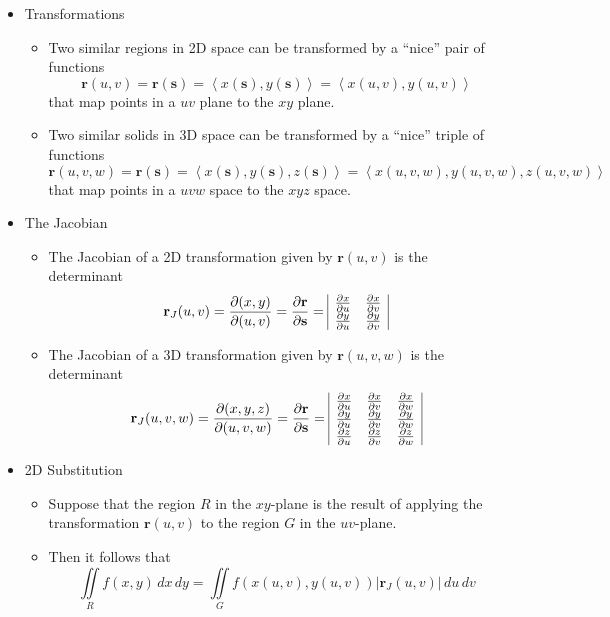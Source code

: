 \documentclass[12pt]{article}
\renewcommand{\vec}[1]{\mathbf{#1}}
\newcommand{\<}{\left<}
\renewcommand{\>}{\right>}
\newcommand{\p}{\partial}
\begin{document}
  \begin{itemize}
  
  \item Transformations
  
    \begin{itemize}
    \item Two similar regions in 2D space can be transformed by a ``nice'' pair of functions \[\vec{r}(u,v) = \vec{r}(\vec{s}) = \<x(\vec{s}),y(\vec{s})\> = \<x(u,v),y(u,v)\>\] that map points in a $uv$ plane to the $xy$ plane.
    \item Two similar solids in 3D space can be transformed by a ``nice'' triple of functions \[\vec{r}(u,v,w) = \vec{r}(\vec{s}) = \<x(\vec{s}),y(\vec{s}),z(\vec{s})\> = \<x(u,v,w),y(u,v,w),z(u,v,w)\>\] that map points in a $uvw$ space to the $xyz$ space.
    \end{itemize}
  
  \item The Jacobian
  
    \begin{itemize}
    \item The Jacobian of a 2D transformation given by $\vec{r}(u,v)$ is the determinant
\[
\vec{r}_J(u,v) = \frac{\p (x,y)}{\p (u,v)} = \frac{\p\vec{r}}{\p\vec{s}} =
\begin{array}{|c c|}
\frac{\p x}{\p u} & \frac{\p x}{\p v} \\
\frac{\p y}{\p u} & \frac{\p y}{\p v} \\
\end{array}
\]
    \item The Jacobian of a 3D transformation given by $\vec{r}(u,v,w)$ is the determinant
\[
\vec{r}_J(u,v,w) = \frac{\partial (x,y,z)}{\partial (u,v,w)} = \frac{\p\vec{r}}{\p\vec{s}} =
\begin{array}{|c c c|}
\frac{\partial x}{\partial u} & \frac{\partial x}{\partial v} & \frac{\partial x}{\partial w} \\
\frac{\partial y}{\partial u} & \frac{\partial y}{\partial v} & \frac{\partial y}{\partial w} \\
\frac{\partial z}{\partial u} & \frac{\partial z}{\partial v} & \frac{\partial z}{\partial w} \\
\end{array}
\]
    \end{itemize}
    
  \item 2D Substitution
  
    \begin{itemize}
    \item Suppose that the region $R$ in the $xy$-plane is the result of applying the transformation $\vec{r}(u,v)$ to the region $G$ in the $uv$-plane.
    \item Then it follows that \[\iint\limits_R f(x,y)\,dx\,dy = \iint\limits_G f(x(u,v),y(u,v))|\vec{r}_J(u,v)|\,du\,dv\]
    \end{itemize}


\end{itemize}
\end{document}
